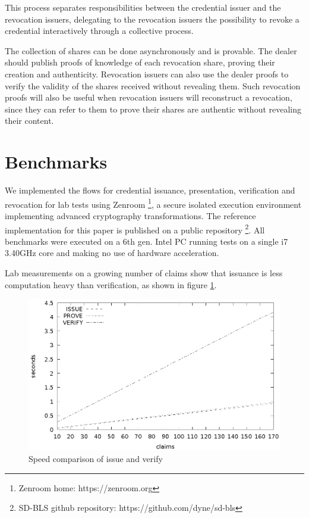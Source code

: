 This process separates responsibilities between the credential issuer
and the revocation issuers, delegating to the revocation issuers the
possibility to revoke a credential interactively through a collective
process.

The collection of shares can be done asynchronously and is provable.
The dealer should publish proofs of knowledge of each revocation
share, proving their creation and authenticity. Revocation issuers can
also use the dealer proofs to verify the validity of the shares
received without revealing them. Such revocation proofs will also be
useful when revocation issuers will reconstruct a revocation, since
they can refer to them to prove their shares are authentic without
revealing their content.

\section{Benchmarks}

We implemented the flows for credential issuance, presentation,
verification and revocation for lab tests using
Zenroom \footnote{Zenroom home: https://zenroom.org}, a secure
isolated execution environment implementing advanced cryptography
transformations. The reference implementation for this paper is
published on a public repository \footnote{SD-BLS github repository:
https://github.com/dyne/sd-bls}. All benchmarks were executed on a 6th
gen. Intel PC running tests on a single i7 3.40GHz core and making no
use of hardware acceleration.

Lab measurements on a growing number of claims show that issuance is
less computation heavy than verification, as shown in figure
\ref{fig:issueproveverify}.

\begin{figure}
    \centering
    \includegraphics[width=1\linewidth]{issueproveverify.eps}

    \caption{Speed comparison of issue and verify}
    \label{fig:issueproveverify}
\end{figure}

